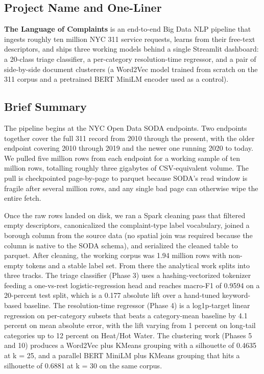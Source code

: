 \documentclass[11pt,letterpaper]{article}
\begin{document}
\subsection{Project Name and One-Liner}

\textbf{The Language of Complaints} is an end-to-end Big Data NLP pipeline that ingests roughly ten million NYC 311 service requests, learns from their free-text descriptors, and ships three working models behind a single Streamlit dashboard: a 20-class triage classifier, a per-category resolution-time regressor, and a pair of side-by-side document clusterers (a Word2Vec model trained from scratch on the 311 corpus and a pretrained BERT MiniLM encoder used as a control).

\subsection{Brief Summary}

The pipeline begins at the NYC Open Data SODA endpoints. Two endpoints together cover the full 311 record from 2010 through the present, with the older endpoint covering 2010 through 2019 and the newer one running 2020 to today. We pulled five million rows from each endpoint for a working sample of ten million rows, totalling roughly three gigabytes of CSV-equivalent volume. The pull is checkpointed page-by-page to parquet because SODA's read window is fragile after several million rows, and any single bad page can otherwise wipe the entire fetch.

Once the raw rows landed on disk, we ran a Spark cleaning pass that filtered empty descriptors, canonicalized the complaint-type label vocabulary, joined a borough column from the source data (no spatial join was required because the column is native to the SODA schema), and serialized the cleaned table to parquet. After cleaning, the working corpus was 1.94 million rows with non-empty tokens and a stable label set. From there the analytical work splits into three tracks. The triage classifier (Phase 3) uses a hashing-vectorized tokenizer feeding a one-vs-rest logistic-regression head and reaches macro-F1 of 0.9594 on a 20-percent test split, which is a 0.177 absolute lift over a hand-tuned keyword-based baseline. The resolution-time regressor (Phase 4) is a log1p-target linear regression on per-category subsets that beats a category-mean baseline by 4.1 percent on mean absolute error, with the lift varying from 1 percent on long-tail categories up to 12 percent on Heat/Hot Water. The clustering work (Phases 5 and 10) produces a Word2Vec plus KMeans grouping with a silhouette of 0.4635 at k = 25, and a parallel BERT MiniLM plus KMeans grouping that hits a silhouette of 0.6881 at k = 30 on the same corpus.
\end{document}
